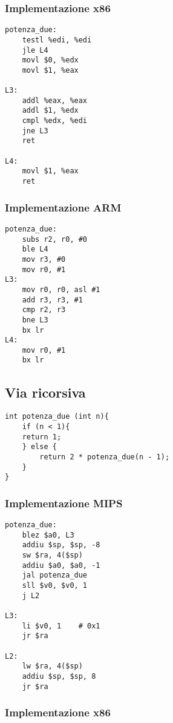 \documentclass[class=book, crop=false, oneside]{standalone}
\begin{document}
\subsubsection{Implementazione x86}

\begin{verbatim}
potenza_due:
	testl %edi, %edi
	jle L4
	movl $0, %edx
	movl $1, %eax

L3:
	addl %eax, %eax
	addl $1, %edx
	cmpl %edx, %edi
	jne L3
	ret

L4:
	movl $1, %eax
	ret
\end{verbatim}

\subsubsection{Implementazione ARM}

\begin{verbatim}
potenza_due:
	subs r2, r0, #0
	ble L4
	mov r3, #0
	mov r0, #1
L3:
	mov r0, r0, asl #1
	add r3, r3, #1
	cmp r2, r3
	bne L3
	bx lr
L4:
	mov r0, #1
	bx lr
\end{verbatim}

\subsection*{Via ricorsiva}

\begin{verbatim}
int potenza_due (int n){
	if (n < 1){
	return 1;
	} else {
		return 2 * potenza_due(n - 1);
	}
}
\end{verbatim}

\subsubsection{Implementazione MIPS}

\begin{verbatim}
potenza_due:
	blez $a0, L3
	addiu $sp, $sp, -8
	sw $ra, 4($sp)
	addiu $a0, $a0, -1
	jal potenza_due
	sll $v0, $v0, 1
	j L2

L3:
	li $v0, 1	 # 0x1
	jr $ra

L2:
	lw $ra, 4($sp)
	addiu $sp, $sp, 8
	jr $ra
\end{verbatim}

\subsubsection{Implementazione x86}
\end{document}
